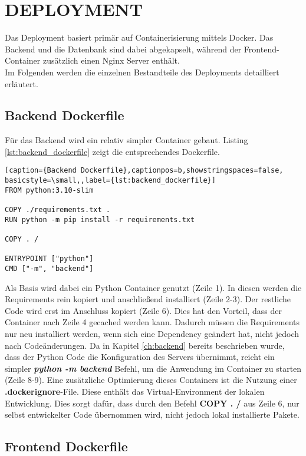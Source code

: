 \section{DEPLOYMENT}\label{ch:deployment}

Das Deployment basiert primär auf Containerisierung mittels Docker. 
Das Backend und die Datenbank sind dabei abgekapselt, während der Frontend-Container zusätzlich einen Nginx Server enthält.\\
Im Folgenden werden die einzelnen Bestandteile des Deployments detailliert erläutert.

\subsection{Backend Dockerfile}

Für das Backend wird ein relativ simpler Container gebaut. Listing \ref{lst:backend_dockerfile} zeigt die entsprechendes Dockerfile.
\begin{lstlisting}[caption={Backend Dockerfile},captionpos=b,showstringspaces=false, basicstyle=\small,,label={lst:backend_dockerfile}]
FROM python:3.10-slim

COPY ./requirements.txt .
RUN python -m pip install -r requirements.txt

COPY . /

ENTRYPOINT ["python"]
CMD ["-m", "backend"]
\end{lstlisting}

Als Basis wird dabei ein Python Container genutzt (Zeile 1). 
In diesen werden die Requirements rein kopiert und anschließend installiert (Zeile 2-3).
Der restliche Code wird erst im Anschluss kopiert (Zeile 6). 
Dies hat den Vorteil, dass der Container nach Zeile 4 gecached werden kann. 
Dadurch müssen die Requirements nur neu installiert werden, wenn sich eine Dependency geändert hat, nicht jedoch nach Codeänderungen. 
Da in Kapitel \ref{ch:backend} bereits beschrieben wurde, dass der Python Code die Konfiguration des Servers übernimmt, reicht ein simpler \textbf{\textit{python -m backend}} Befehl, um die Anwendung im Container zu starten (Zeile 8-9).
Eine zusätzliche Optimierung dieses Containers ist die Nutzung einer \textbf{.dockerignore}-File. Diese enthält das Virtual-Environment der lokalen Entwicklung. Dies sorgt dafür, dass durch den Befehl \textbf{COPY . /} aus Zeile 6, nur selbst entwickelter Code übernommen wird, nicht jedoch lokal installierte Pakete.

\subsection{Frontend Dockerfile}

